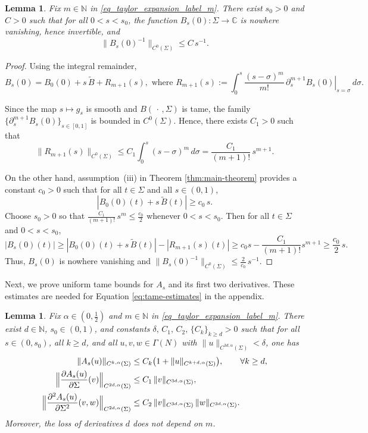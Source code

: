 \documentclass[11pt]{amsart}
\newcommand{\N}{\mathbb{N}}
\newcommand{\C}{\mathbb{C}}
\newcommand{\del}{\partial}
\newcommand{\pa}{\partial}
\newtheorem{lemma}[theorem]{Lemma}
\begin{document}
\begin{lemma}\label{lem:B-is-invertible}
	Fix $m\in\N$ in \eqref{eq_taylor_expansion_label_m}. There exist $s_0>0$ and $C>0$ such that for all $0<s<s_0$,
	the function $B_s(0)\colon \Sigma\to\C$ is nowhere vanishing, hence invertible, and
	\[
	\|B_s(0)^{-1}\|_{C^0(\Sigma)} \le C\, s^{-1}.
	\]
\end{lemma}
\begin{proof}
	Using the integral remainder,
	\begin{equation}\label{eq:taylor-B}
		B_s(0)=B_0(0)+s\,\widetilde B + R_{m+1}(s),
		\text{ where }
		R_{m+1}(s):=\int_0^s \frac{(s-\sigma)^m}{m!}\,
		\left.\pa_s^{m+1}B_s(0)\right|_{s=\sigma}\,d\sigma .
	\end{equation}

	Since the map $s\mapsto g_s$ is smooth and $B(\,\cdot\,,\Sigma)$ is tame, the family $\{\pa_s^{m+1}B_s(0)\}_{s\in[0,1]}$ is bounded in $C^0(\Sigma)$. Hence, there exists
	$C_1>0$ such that
	\[
	\|R_{m+1}(s)\|_{C^0(\Sigma)}
	\le C_1\int_0^s (s-\sigma)^m\,d\sigma
	= \frac{C_1}{(m+1)!}\,s^{m+1}.
	\]
	
	On the other hand, assumption~(iii) in Theorem \ref{thm:main-theorem} provides a constant $c_0>0$ such that for all $t\in\Sigma$
	and all $s\in(0,1)$,
	\[
	|B_0(0)(t)+s\,\widetilde B(t)| \ge c_0\, s .
	\]
	Choose $s_0>0$ so that $\frac{C_1}{(m+1)!}\,s^{m}\le \frac{c_0}{2}$ whenever $0<s<s_0$.
	Then for all $t\in\Sigma$ and $0<s<s_0$,
	\[
	|B_s(0)(t)|
	\ge |B_0(0)(t)+s\,\widetilde B(t)| - |R_{m+1}(s)(t)|
	\ge c_0 s - \frac{C_1}{(m+1)!} s^{m+1}
	\ge \frac{c_0}{2}\, s .
	\]
	Thus, $B_s(0)$ is nowhere vanishing and $\|B_s(0)^{-1}\|_{C^0(\Sigma)} \le \frac{2}{c_0}\, s^{-1}.$
\end{proof}
Next, we prove uniform tame bounds for $A_s$ and its first two derivatives. These estimates are needed for Equation \eqref{eq:tame-estimates} in the appendix.
\begin{lemma}\label{lem:tame-estimates-As}
	Fix $\alpha\in\left(0,\frac12\right)$ and $m\in\N$ in \eqref{eq_taylor_expansion_label_m}.
	There exist $d\in\N$, $s_0\in(0,1)$, and constants
	$\delta,\,C_1,\,C_2,\,\{C_k\}_{k\ge d}>0$
	such that for all $s\in(0,s_0)$, all $k\ge d$, and all $u,v,w\in\Gamma(N)$ with
	$\|u\|_{C^{3d,\alpha}(\Sigma)}<\delta$, one has
	\begin{align*}
		\|A_s(u)\|_{C^{k,\alpha}(\Sigma)} &\le C_k\bigl(1+\|u\|_{C^{k+d,\alpha}(\Sigma)}\bigr), \qquad \forall k\ge d,\\
		\Bigl\|\frac{\del A_s(u)}{\del\Sigma}(v)\Bigr\|_{C^{2d,\alpha}(\Sigma)}
		&\le C_1\,\|v\|_{C^{3d,\alpha}(\Sigma)},\\
		\Bigl\|\frac{\del^2 A_s(u)}{\del\Sigma^2}(v,w)\Bigr\|_{C^{2d,\alpha}(\Sigma)}
		&\le C_2\,\|v\|_{C^{3d,\alpha}(\Sigma)}\,\|w\|_{C^{3d,\alpha}(\Sigma)}.
	\end{align*}
	Moreover, the loss of derivatives $d$ does not depend on $m$.
\end{lemma}
\end{document}
